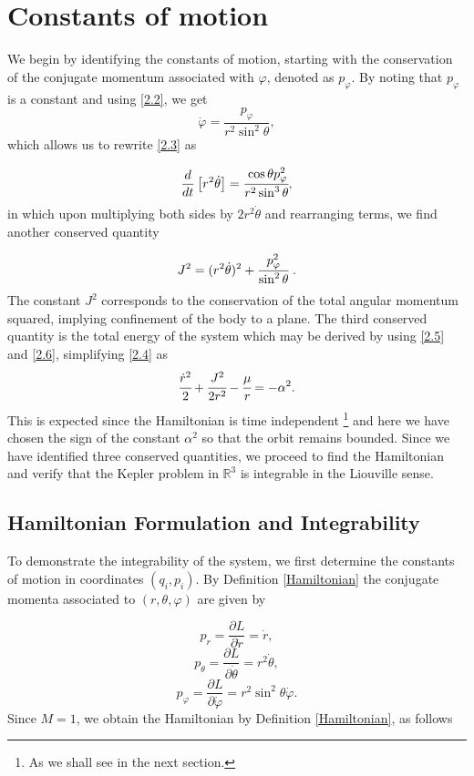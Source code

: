 \documentclass[12pt,oneside]{report}
\theoremstyle{definition}
\begin{document}
\section{Constants of motion}\label{constant of motion kepler}
We begin by identifying the constants of motion, starting with the conservation of the conjugate momentum associated with $\varphi$, denoted as $p_{\varphi}$. By noting that $p_{\varphi}$ is a constant and using \autoref{2.2}, we get
\begin{equation}\label{2.5}
    \dot{\varphi} = \frac{p_{\varphi}}{r^{2}\sin^{2}{\theta}}, 
\end{equation}
\noindent which allows us to rewrite  \autoref{2.3} as

$$ \frac{d}{dt} \left[ r^2 \dot{\theta} \right] = \cfrac{\cos{\theta}  p_{\varphi}^{2}}{r^{2}\sin^{3}{\theta}}, $$
in which upon multiplying both sides by $2r^{2} \dot{\theta}$ and rearranging terms, we find another conserved quantity

\begin{equation}\label{2.6} J^{2} = (r^{2}\dot{\theta})^{2} + \cfrac{p_{\varphi}^{2}}{\sin^{2}{\theta}} \ .
\end{equation}
The constant $J^{2}$ corresponds to the conservation of the total angular momentum squared, implying confinement of the body to a plane. The third conserved quantity is the total energy of the system which may be derived by using \autoref{2.5} and  \autoref{2.6},  simplifying  \autoref{2.4} as
\begin{equation}\label{2.8}
 \cfrac{\dot{r}^{2}}{2}  + \cfrac{J^{2}}{2r^{2}}  - \cfrac{\mu}{r} = -\alpha^{2}.
    \end{equation}
 This is expected since the Hamiltonian is time independent \footnote{As we shall see in the next section.} and here we have chosen the sign of the constant $\alpha^2$ so that the orbit remains bounded. Since we have identified three conserved quantities, we proceed to find the Hamiltonian and verify that the Kepler problem in $\mathbb{R}^{3}$ is integrable in the Liouville sense. 
\subsection{Hamiltonian Formulation and Integrability}
To demonstrate the integrability of the system, we first determine the constants of motion in coordinates $(q_{i},p_{i})$. By Definition \ref{Hamiltonian} the conjugate momenta associated to $(r,\theta, \varphi)$ are given by

\begin{equation} \label{2.25}
    p_{r} = \frac{\partial L}{\partial \dot{r}} = \dot{r},
\end{equation}
\begin{equation} \label{2.26}
    p_{\theta} = \frac{\partial L}{\partial \dot{\theta}} = r^{2} \dot{\theta},
\end{equation}
\begin{equation} \label{2.27}
    p_{\varphi} = \frac{\partial L}{\partial \dot{\varphi}} = r^{2} \sin^{2}{\theta} \dot{\varphi}.
\end{equation}
Since $M = 1$, we obtain the Hamiltonian by Definition \ref{Hamiltonian}, as follows
\end{document}
